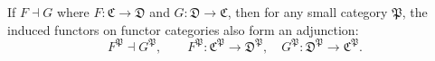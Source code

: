 If $F \dashv G$ where $F : \mathfrak{C} \to \mathfrak{D}$ and $G : \mathfrak{D} \to \mathfrak{C}$, then for any small category $\mathfrak{P}$, the induced functors on functor categories also form an adjunction:
$$
F^{\mathfrak{P}} \dashv G^{\mathfrak{P}}, \qquad F^{\mathfrak{P}} : \mathfrak{C}^{\mathfrak{P}} \to \mathfrak{D}^{\mathfrak{P}}, \quad G^{\mathfrak{P}} : \mathfrak{D}^{\mathfrak{P}} \to \mathfrak{C}^{\mathfrak{P}}.
$$
